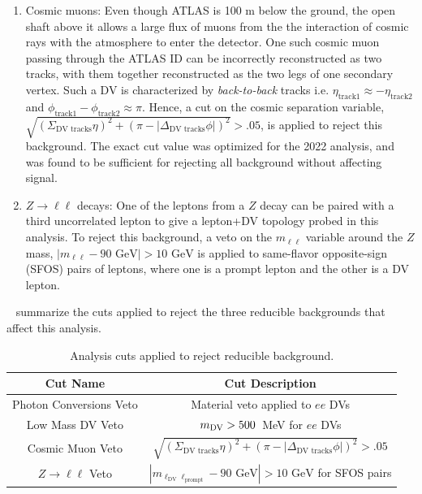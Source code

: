 \begin{enumerate}
    \item Cosmic muons: Even though ATLAS is 100 m below the ground, the open shaft above it allows a large flux of muons from the the interaction of cosmic rays with the atmosphere to enter the detector. One such cosmic muon passing through the ATLAS ID can be incorrectly reconstructed as two tracks, with them together reconstructed as the two legs of one secondary vertex. Such a DV is characterized by \textit{back-to-back} tracks i.e. $\eta_\mathrm{track1}\approx-\eta_\mathrm{track2}$ and $\phi_\mathrm{track1}-\phi_\mathrm{track2}\approx\pi$. Hence, a cut on the cosmic separation variable, $\sqrt{(\Sigma_\text{DV tracks}\eta)^2+(\pi-|\Delta_\text{DV tracks}\phi|)^2}>.05$, is applied to reject this background. The exact cut value was optimized for the 2022 analysis, and was found to be sufficient for rejecting all background without affecting signal.

    \item $Z\to\ell\ell$ decays: One of the leptons from a $Z$ decay can be paired with a third uncorrelated lepton to give a lepton+DV topology probed in this analysis. To reject this background, a veto on the $m_{\ell\ell}$ variable around the $Z$ mass, $|m_{\ell\ell}-90\text{ GeV}|>10\text{ GeV}$ is applied to same-flavor opposite-sign (SFOS) pairs of leptons, where one is a prompt lepton and the other is a DV lepton.
\end{enumerate}

~ summarize the cuts applied to reject the three reducible backgrounds that affect this analysis.

\begin{table}[!ht]
    \centering
    \begin{tabular}{cc}
        \hline\hline
         Cut Name & Cut Description\\
         \hline
         Photon Conversions Veto & Material veto applied to $ee$ DVs\\
         Low Mass DV Veto & $m_{\mathrm{DV}}>500$~MeV for $ee$ DVs\\
         Cosmic Muon Veto & $\sqrt{(\Sigma_\text{DV tracks}\eta)^2+(\pi-|\Delta_\text{DV tracks}\phi|)^2}>.05$\\
         $Z\to\ell\ell$ Veto & $|m_{\ell_\mathrm{DV}\ell_\mathrm{prompt}}-90\text{ GeV}|>10\text{ GeV}$ for SFOS pairs \\
         \hline\hline
    \end{tabular}
    \caption{Analysis cuts applied to reject reducible background.}
    \label{tab:cuts_reducible}
\end{table}

